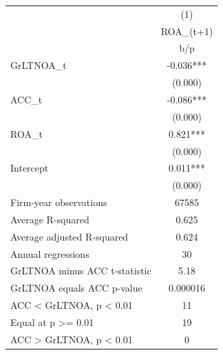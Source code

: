 {
\def\sym#1{\ifmmode^{#1}\else\(^{#1}\)\fi}
\begin{tabular}{l*{1}{c}}
\hline\hline
                    &\multicolumn{1}{c}{(1)}\\
                    &\multicolumn{1}{c}{ROA\_(t+1)}\\
                    &         b/p   \\
\hline
GrLTNOA\_t           &      -0.036***\\
                    &     (0.000)   \\
ACC\_t               &      -0.086***\\
                    &     (0.000)   \\
ROA\_t               &       0.821***\\
                    &     (0.000)   \\
Intercept           &       0.011***\\
                    &     (0.000)   \\
\hline
Firm-year observations&       67585   \\
Average R-squared   &       0.625   \\
Average adjusted R-squared&       0.624   \\
Annual regressions  &          30   \\
GrLTNOA minus ACC t-statistic&        5.18   \\
GrLTNOA equals ACC p-value&    0.000016   \\
ACC < GrLTNOA, p < 0.01&          11   \\
Equal at p >= 0.01  &          19   \\
ACC > GrLTNOA, p < 0.01&           0   \\
\hline\hline
\end{tabular}
}
